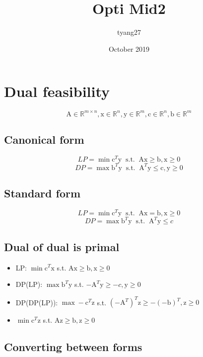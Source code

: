 \documentclass[6pt]{article}
\title{Opti Mid2}
\author{tyang27}
\date{October 2019}
\def\x{\textrm{x}}
\def\y{\textrm{y}}
\def\z{\textrm{z}}
\def\c{\textrm{c}}
\def\b{\textrm{b}}
\def\A{\textrm{A}}
\begin{document}
\maketitle
\section{Dual feasibility}
$$\A\in \mathbb{R}^{m\times n}, \x \in \mathbb{R}^{n}, \y \in \mathbb{R}^{m}, \c \in \mathbb{R}^n, \b \in \mathbb{R}^{m}$$
\subsection{Canonical form}
$$LP=\min \c^T\y ~\textrm{ s.t. }~ \A\x\geq\b, \x\geq 0$$
$$DP=\max \b^T\y
~\textrm{ s.t. }~ \A^T\y\leq \c, \y\geq 0$$

\subsection{Standard form}
$$LP=\min \c^T\y ~\textrm{ s.t. }~ \A\x=\b, \x\geq 0$$
$$DP=\max \b^T\y ~\textrm{ s.t. }~ \A^T\y\leq c$$

\subsection{Dual of dual is primal}
\begin{itemize}
\item LP: $\min \c^T\x$ s.t. $\A\x\geq \b, \x \geq 0$
\item DP(LP): $\max \b^T\y$ s.t. $-\A^T\y\geq -c, \y\geq 0$
\item DP(DP(LP)): $\max -\c^T\z$ s.t. $(-\A^T)^T\z\geq -(-\b)^T, \z\geq 0$ \item $\min \c^T\z$ s.t. $\A\z\geq\b, \z\geq 0$
\end{itemize}

\subsection{Converting between forms}
\end{document}
